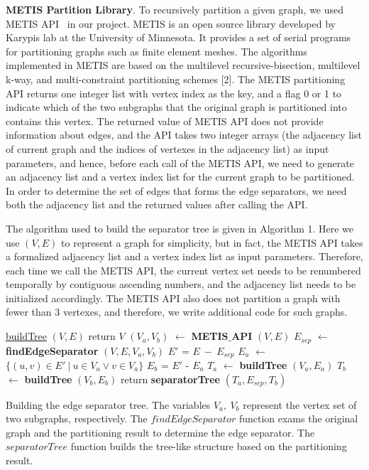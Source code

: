 \documentclass[12pt,glossary]{dalthesis}
\begin{document}
\bigskip
\bigskip

\textbf{METIS Partition Library}. To recursively partition a given graph, we used METIS API~\cite{metis-lib} in our project. METIS is an open source library developed by Karypis lab at the University of Minnesota. It provides a set of serial programs for partitioning graphs such as finite element meshes. The algorithms implemented in METIS are based on the multilevel recursive-bisection, multilevel k-way, and multi-constraint partitioning schemes [2]. The METIS partitioning API returns one integer list with vertex index as the key, and a flag 0 or 1 to indicate which of the two subgraphs that the original graph is partitioned into contains this vertex. The returned value of METIS API does not provide information about edges, and the API takes two integer arrays (the adjacency list of current graph and the indices of vertexes in the adjacency list) as input parameters, and hence, before each call of the METIS API, we need to generate an adjacency list and a vertex index list for the current graph to be partitioned. In order to determine the set of edges that forms the edge separators, we need both the adjacency list and the returned values after calling the API.

\bigskip
\bigskip

The algorithm used to build the separator tree is given in Algorithm 1. Here we use $(V,E)$
to represent a graph for simplicity, but in fact, the METIS API takes a formalized adjacency list and a vertex index list as input parameters. Therefore, each time we call the METIS API, the current vertex set needs to be renumbered temporally by contiguous ascending numbers, and the adjacency list needs to be initialized accordingly. The METIS API also does not partition a graph with fewer than 3 vertexes, and therefore, we write additional code for such graphs.

\bigskip

\begin{algorithm}
    \underline{buildTree} $(V,E)$\;
      {
        return $V$\;
      }
      {
      	$(V_{a},V_{b})$ $\leftarrow$ \textbf{METIS$\_$API} $(V,E)$  \;
		$E_{sep}$ $\leftarrow$ \textbf{findEdgeSeparator} $(V,E,V_{a},V_{b})$ \;
		$E'$ = $E \  - \ E_{sep}$   \;
      	$E_{a}$ $\leftarrow$ $\{ (u,v) \in E' \ | \  u\in V_{a} \vee v \in V_{a} \}$ \;
		$E_{b}$ = $E'$ - $E_{a}$ \;
		$T_{a}$ $\leftarrow$ \textbf{buildTree} $(V_{a},E_{a})$ \;
		$T_{b}$ $\leftarrow$ \textbf{buildTree} $(V_{b},E_{b})$ \;  
        return \textbf{separatorTree} $(T_{a}, E_{sep}, T_{b})$ \; 
      }
    \caption{Building the edge separator tree. The variables $V_{a},\ V_{b}$ represent the vertex set of two subgraphs, respectively. The $findEdgeSeparator$ function exams the original graph and the partitioning result to determine the edge separator. The $separatorTree$ function builds the tree-like structure based on the partitioning result.}
\end{algorithm}
\bigskip
\end{document}
